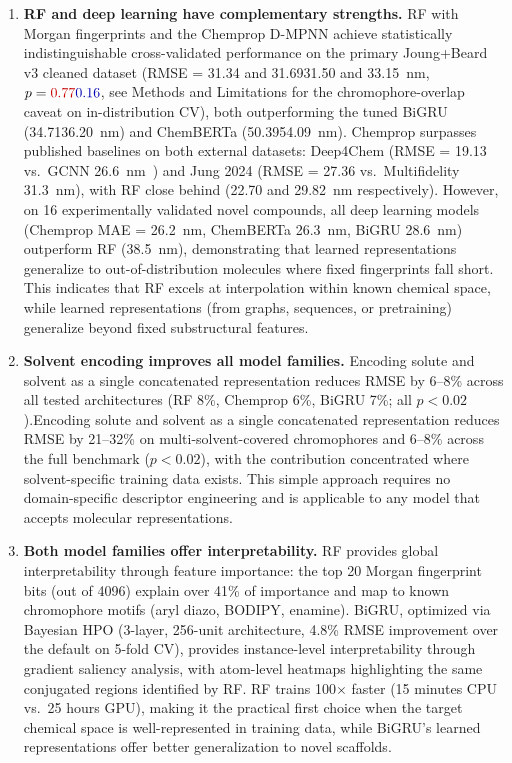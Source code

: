 \documentclass[journal=jcisd8,manuscript=article]{achemso}
\newcommand{\added}[1]{{\color{addedblue}#1}}
\newcommand{\removed}[1]{{\color{removedred}#1}}
\begin{document}
\begin{enumerate}
 \item \textbf{RF and deep learning have complementary strengths.}
 RF with Morgan fingerprints and the Chemprop D-MPNN achieve statistically indistinguishable cross-validated performance on the primary Joung+Beard \added{v3 cleaned }dataset (RMSE = \removed{31.34 and 31.69}\added{31.50 and 33.15}~nm, $p = \removed{0.77}\added{0.16}$\added{, see Methods and Limitations for the chromophore-overlap caveat on in-distribution CV}), both outperforming the tuned BiGRU (\removed{34.71}\added{36.20}~nm) and ChemBERTa (\removed{50.39}\added{54.09}~nm). Chemprop surpasses published baselines on both external datasets: Deep4Chem (RMSE = 19.13 vs.\ GCNN 26.6~nm~\cite{joung2021deep}) and Jung 2024 (RMSE = 27.36 vs.\ Multifidelity 31.3~nm), with RF close behind (22.70 and 29.82~nm respectively).
 However, on 16 experimentally validated novel compounds, all deep learning models (Chemprop MAE = 26.2~nm, ChemBERTa 26.3~nm, BiGRU 28.6~nm) outperform RF (38.5~nm), demonstrating that learned representations generalize to out-of-distribution molecules where fixed fingerprints fall short.
 This indicates that RF excels at interpolation within known chemical space, while learned representations (from graphs, sequences, or pretraining) generalize beyond fixed substructural features.

 \item \textbf{Solvent encoding improves all model families.}
 \removed{Encoding solute and solvent as a single concatenated representation reduces RMSE by 6--8\% across all tested architectures (RF 8\%, Chemprop 6\%, BiGRU 7\%; all $p < 0.02$).}\added{Encoding solute and solvent as a single concatenated representation reduces RMSE by 21--32\% on multi-solvent-covered chromophores and 6--8\% across the full benchmark ($p < 0.02$), with the contribution concentrated where solvent-specific training data exists.}
 This simple approach requires no domain-specific descriptor engineering and is applicable to any model that accepts molecular representations.

 \item \textbf{Both model families offer interpretability.}
 RF provides global interpretability through feature importance: the top 20 Morgan fingerprint bits (out of 4096) explain over 41\% of importance and map to known chromophore motifs (aryl diazo, BODIPY, enamine).
 BiGRU, optimized via Bayesian HPO (3-layer, 256-unit architecture, 4.8\% RMSE improvement over the default on 5-fold CV), provides instance-level interpretability through gradient saliency analysis, with atom-level heatmaps highlighting the same conjugated regions identified by RF.
 RF trains 100$\times$ faster (15 minutes CPU vs.\ 25 hours GPU), making it the practical first choice when the target chemical space is well-represented in training data, while BiGRU's learned representations offer better generalization to novel scaffolds.


\end{enumerate}
\end{document}
